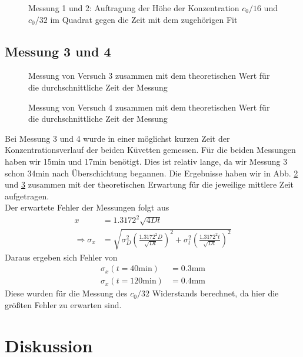 \documentclass[12pt,a4paper,titlepage,headinclude,bibtotoc]{scrartcl}
\begin{document}
\begin{figure}[!h]
\centering

\caption{Messung 1 und 2: Auftragung der Höhe der Konzentration $c_0/16$ und $c_0/32$ im Quadrat gegen die Zeit mit dem zugehörigen Fit\label{fig:M12}}
\end{figure}

\subsection{Messung 3 und 4}
\begin{figure}[h!]
 \centering
 
 \caption{Messung von Versuch 3 zusammen mit dem theoretischen Wert für die durchschnittliche Zeit der Messung\label{fig:m3}}
\end{figure}
\begin{figure}[h!]
 \centering
 
 \caption{Messung von Versuch 4 zusammen mit dem theoretischen Wert für die durchschnittliche Zeit der Messung\label{fig:m4}}
\end{figure}
Bei Messung 3 und 4 wurde in einer möglichst kurzen Zeit der Konzentrationsverlauf der beiden Küvetten gemessen.
Für die beiden Messungen haben wir 15min und 17min benötigt.
Dies ist relativ lange, da wir Messung 3 schon 34min nach Überschichtung begannen.
Die Ergebnisse haben wir in Abb. \ref{fig:m3} und \ref{fig:m4} zusammen mit der theoretischen Erwartung für die jeweilige mittlere Zeit aufgetragen.\\
Der erwartete Fehler der Messungen folgt aus 
\begin{align*}
	x&=1.3172^2\sqrt{4Dt}\\
	\Rightarrow \sigma_x&=\sqrt{\sigma_D^2 \left(\frac{1.3172^2D}{\sqrt{Dt}} \right)^{2}+\sigma_t^2 \left( \frac{1.3172^2t}{\sqrt{Dt}}\right)^2}
\end{align*}	
Daraus ergeben sich Fehler von 
\begin{align*}
	\sigma_x(t=40\text{min})&=0.3\text{mm}\\
	\sigma_x(t=120\text{min})&=0.4\text{mm}
\end{align*}	
Diese wurden für die Messung des $c_0/32$ Widerstands berechnet, da hier die größten Fehler zu erwarten sind.

\newpage
\section{Diskussion}
\label{sec:diskussion}
\end{document}
